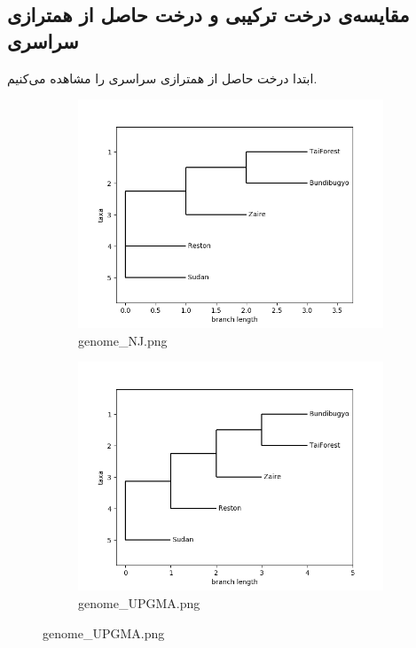\documentclass[11pt]{article}
\begin{document}
 \subsection{مقایسه‌ی درخت ترکیبی و درخت حاصل از همترازی سراسری}
 ابتدا درخت حاصل از همترازی سراسری را مشاهده می‌کنیم.
\begin{figure}[H]
  \centering
  \begin{subfigure}[b]{0.4\linewidth}
    \includegraphics[width=\linewidth]{../Data/Trees/genome_NJ.png}
    \caption{genome\_NJ.png}
  \end{subfigure}
  \begin{subfigure}[b]{0.4\linewidth}
    \includegraphics[width=\linewidth]{../Data/Trees/genome_UPGMA.png}
    \caption{genome\_UPGMA.png}
  \end{subfigure}
\end{figure}
\end{document}
